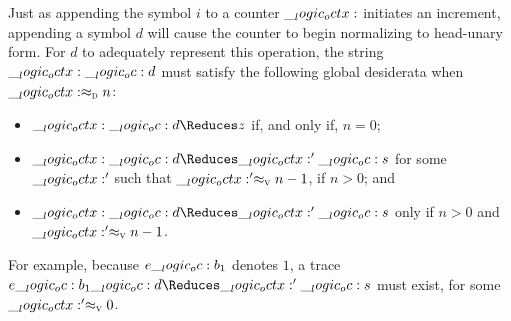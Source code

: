 Just as appending the symbol $i$ to a counter $\__logic_octx:$ initiates an increment, appending a symbol $d$ will cause the counter to begin normalizing to head-unary form.
For $d$ to adequately represent this operation, the string $\__logic_octx: \__logic_oc: d$ must satisfy the following global desiderata when $\__logic_octx: \approx\sb{\text{\normalfont\scshape d}} n$:
%
  \begin{itemize}%
  \item $\octx \oc d \Reduces z$ if, and only if, $n=0$;
  \item $\octx \oc d \Reduces \octx' \oc s$ for some $\__logic_octx:'$ such that $\__logic_octx:' \approx\sb{\text{\normalfont\scshape v}} n-1$, if $n > 0$; and
  \item $\octx \oc d \Reduces \octx' \oc s$ only if $n > 0$ and $\__logic_octx:' \approx\sb{\text{\normalfont\scshape v}} n-1$.
  \end{itemize}
%
For example, because $e \__logic_oc: b_1$ denotes $1$, a trace $e \oc b_1 \oc d \Reduces \octx' \oc s$ must exist, for some $\__logic_octx:' \approx\sb{\text{\normalfont\scshape v}} 0$.


